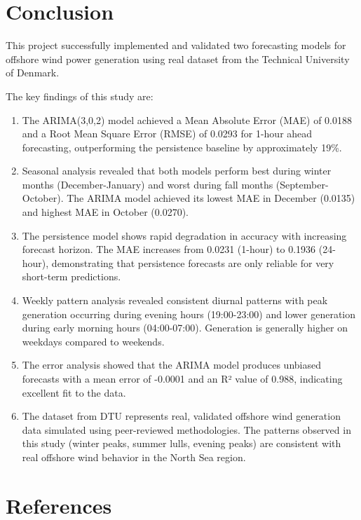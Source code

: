 \documentclass[12pt,a4paper]{article}
\begin{document}
\section{Conclusion}

This project successfully implemented and validated two forecasting models for offshore wind power generation using real dataset from the Technical University of Denmark.

The key findings of this study are:

\begin{enumerate}
\item The ARIMA(3,0,2) model achieved a Mean Absolute Error (MAE) of 0.0188 and a Root Mean Square Error (RMSE) of 0.0293 for 1-hour ahead forecasting, outperforming the persistence baseline by approximately 19\%.

\item Seasonal analysis revealed that both models perform best during winter months (December-January) and worst during fall months (September-October). The ARIMA model achieved its lowest MAE in December (0.0135) and highest MAE in October (0.0270).

\item The persistence model shows rapid degradation in accuracy with increasing forecast horizon. The MAE increases from 0.0231 (1-hour) to 0.1936 (24-hour), demonstrating that persistence forecasts are only reliable for very short-term predictions.

\item Weekly pattern analysis revealed consistent diurnal patterns with peak generation occurring during evening hours (19:00-23:00) and lower generation during early morning hours (04:00-07:00). Generation is generally higher on weekdays compared to weekends.

\item The error analysis showed that the ARIMA model produces unbiased forecasts with a mean error of -0.0001 and an R² value of 0.988, indicating excellent fit to the data.

\item The dataset from DTU represents real, validated offshore wind generation data simulated using peer-reviewed methodologies. The patterns observed in this study (winter peaks, summer lulls, evening peaks) are consistent with real offshore wind behavior in the North Sea region.
\end{enumerate}

\newpage
\section*{References}
\end{document}
